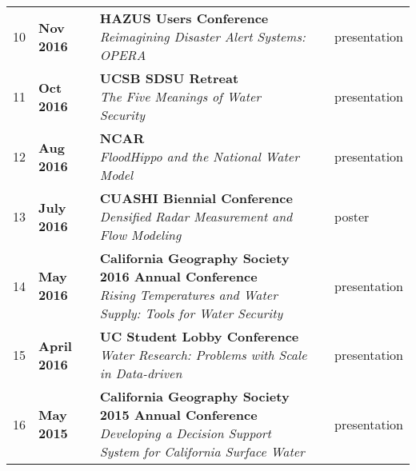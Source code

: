 \documentclass{article}
\begin{document}
\begin{longtable}{lp{2.5cm}P{8.5cm}p{1cm}l}
  10 & \textbf{Nov 2016 } & {\textbf{HAZUS Users Conference} \newline \textit{Reimagining Disaster Alert Systems: OPERA } } &  & presentation \\ 
  11 & \textbf{Oct 2016 } & {\textbf{UCSB SDSU Retreat} \newline \textit{The Five Meanings of Water Security } } &  & presentation \\ 
  12 & \textbf{Aug 2016 } & {\textbf{NCAR} \newline \textit{FloodHippo and the National Water Model } } &  & presentation \\ 
  13 & \textbf{July 2016 } & {\textbf{CUASHI Biennial Conference} \newline \textit{Densified Radar Measurement and Flow Modeling } } &  & poster \\ 
  14 & \textbf{May 2016 } & {\textbf{California Geography Society 2016 Annual Conference} \newline \textit{Rising Temperatures and Water Supply: Tools for Water Security } } &  & presentation \\ 
  15 & \textbf{April 2016 } & {\textbf{UC Student Lobby Conference} \newline \textit{Water Research: Problems with Scale in Data-driven } } &  & presentation \\ 
  16 & \textbf{May 2015 } & {\textbf{California Geography Society 2015 Annual Conference} \newline \textit{Developing a Decision Support System for California Surface Water } } &  & presentation \\ 
  \end{longtable}

\end{document}
